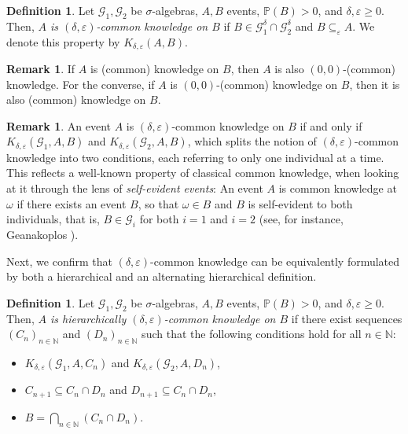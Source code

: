 \documentclass[a4paper, 10pt]{article}
\numberwithin{theorem}{section}
\theoremstyle{definition}
\newtheorem{definition}[theorem]{Definition}
\newtheorem{remark}[theorem]{Remark}
\newcommand{\N}{\mathbb{N}}
\newcommand{\G}{\mathcal{G}}
\renewcommand{\epsilon}{\varepsilon}
\renewcommand{\P}{\mathbb{P}}
\begin{document}
\begin{definition}
	Let $\G_1, \G_2$ be $\sigma$-algebras, $A, B$ events, $\P(B)>0$, and $\delta,\epsilon \geq 0$. Then, \emph{$A$ is $(\delta, \epsilon)$-common knowledge on $B$} if $B\in \G_1^\delta \cap \G_2^\delta$ and $B \subseteq_\epsilon A.$  We denote this property by $K_{\delta,\epsilon}( A,B)$.  
\end{definition}

\begin{remark}
	If $A$ is (common) knowledge on $B$, then $A$ is also $(0,0)$-(common) knowledge. For the converse, if $A$ is $(0,0)$-(common) knowledge on $B$, then it is also (common) knowledge on $B$. 
\end{remark}

\begin{remark}\label{remark: self-evident} An event $A$ is $(\delta, \epsilon)$-common knowledge on $B$ if and only if $K_{\delta,\epsilon}(\G_1, A,B)$ and $K_{\delta,\epsilon}(\G_2, A,B)$, which splits the notion of $(\delta, \epsilon)$-common knowledge into two conditions, each referring to only one individual at a time. This reflects a well-known property of classical common knowledge, when looking at it through the lens of \emph{self-evident events}: 
  An event $A$ is common knowledge at $\omega$ if there exists an event $B$, so that $\omega \in B$ and $B$ is self-evident to both individuals, that is, $B \in \G_i$ for both $i=1$ and $i=2$ (see, for instance, Geanakoplos \cite{Ge94}).
    \end{remark}

Next, we confirm that $(\delta,\epsilon)$-common knowledge can be equivalently formulated by both a hierarchical and an alternating hierarchical definition.



\begin{definition}
	Let $\G_1,\G_2$ be $\sigma$-algebras, $A,B$ events, $\P(B)>0$, and $\delta,\epsilon \geq 0$. Then, \emph{$A$ is hierarchically $(\delta, \epsilon)$-common knowledge on $B$} if there exist sequences $(C_n)_{n\in \N}$ and $(D_n)_{n\in \N}$ such that the following conditions hold for all $n \in \N$:
    \begin{itemize}
        \item $K_{\delta,\epsilon}(\G_1, A, C_n)$ and $K_{\delta,\epsilon}(\G_2,A,D_n)$,  
        \item $C_{n+1} \subseteq C_n \cap D_n$ and $D_{n+1} \subseteq C_n \cap D_n$, 
        \item $B=\bigcap_{n\in \N} \left( C_n \cap D_n \right)$.
    \end{itemize}
\end{definition}
\end{document}

